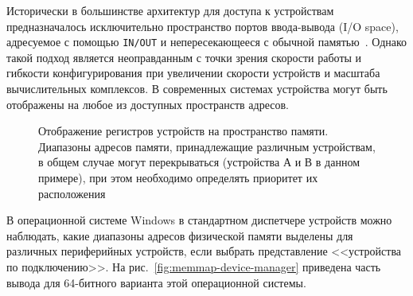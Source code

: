 Исторически в большинстве архитектур для доступа к устройствам предназначалось исключительно пространство портов ввода-вывода (\abbr I/O space), адресуемое с помощью \texttt{IN/OUT} и непересекающееся с обычной памятью~\cite{cs473-io}. Однако такой подход является неоправданным с точки зрения скорости работы и гибкости конфигурирования при увеличении скорости устройств и масштаба вычислительных комплексов. В современных системах устройства могут быть отображены на любое из доступных пространств адресов.

\begin{figure}[htb]
    \centering
    \caption[Отображение регистров на пространство памяти]{Отображение регистров устройств на пространство памяти. Диапазоны адресов памяти, принадлежащие различным устройствам, в общем случае могут перекрываться (устройства А и В в данном примере), при этом необходимо определять приоритет их расположения}
    \label{fig:memmap}
\end{figure}

В операционной системе Windows в стандартном диспетчере устройств можно наблюдать, какие диапазоны адресов физической памяти выделены для различных периферийных устройств, если выбрать представление <<устройства по подключению>>. На рис.~\ref{fig:memmap-device-manager} приведена часть вывода для 64-битного варианта этой операционной системы.

